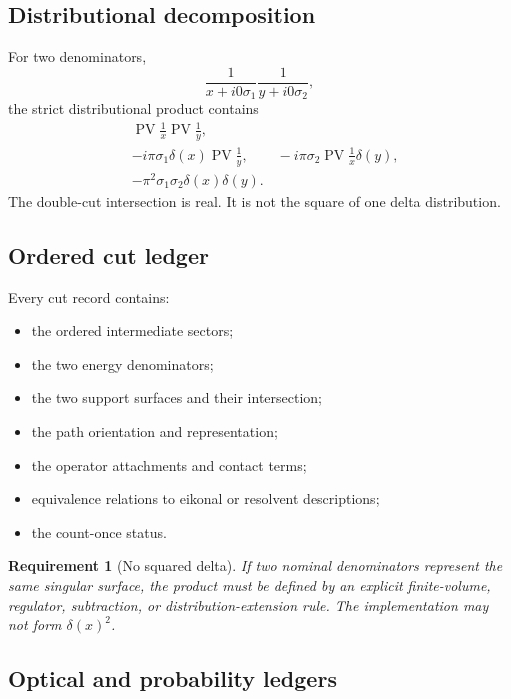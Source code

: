 \documentclass[11pt]{article}
\newtheorem{requirement}[definition]{Requirement}
\newcommand{\PV}{\operatorname{PV}}
\begin{document}
\subsection{Distributional decomposition}

For two denominators,
\begin{equation}
 \frac{1}{x+i0\sigma_1}
 \frac{1}{y+i0\sigma_2},
 \label{eq:two-denom}
\end{equation}
the strict distributional product contains
\begin{align}
 &\PV\frac1x\PV\frac1y,
 \label{eq:pvpv}\\
 &-i\pi\sigma_1\delta(x)\PV\frac1y,
 \qquad
 -i\pi\sigma_2\PV\frac1x\delta(y),
 \label{eq:singlecuts}\\
 &-\pi^2\sigma_1\sigma_2\delta(x)\delta(y).
 \label{eq:doublecut}
\end{align}
The double-cut intersection is real.  It is not the square of one delta
distribution.

\subsection{Ordered cut ledger}

Every cut record contains:
\begin{itemize}
 \item the ordered intermediate sectors;
 \item the two energy denominators;
 \item the two support surfaces and their intersection;
 \item the path orientation and representation;
 \item the operator attachments and contact terms;
 \item equivalence relations to eikonal or resolvent descriptions;
 \item the count-once status.
\end{itemize}

\begin{requirement}[No squared delta]
If two nominal denominators represent the same singular surface, the product
must be defined by an explicit finite-volume, regulator, subtraction, or
distribution-extension rule.  The implementation may not form
\(\delta(x)^2\).
\end{requirement}

\subsection{Optical and probability ledgers}
\end{document}
